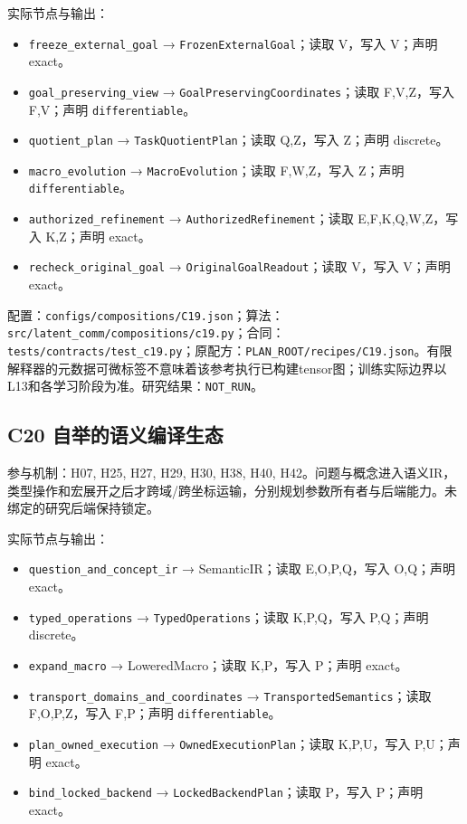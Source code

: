 \documentclass[
  10pt,
]{article}
\begin{document}
实际节点与输出：

\begin{itemize}
\item
  \nolinkurl{freeze_external_goal} →
  \nolinkurl{FrozenExternalGoal}；读取 V，写入 V；声明 exact。
\item
  \nolinkurl{goal_preserving_view} →
  \nolinkurl{GoalPreservingCoordinates}；读取 F,V,Z，写入 F,V；声明
  \nolinkurl{differentiable}。
\item
  \nolinkurl{quotient_plan} → \nolinkurl{TaskQuotientPlan}；读取
  Q,Z，写入 Z；声明 discrete。
\item
  \nolinkurl{macro_evolution} → \nolinkurl{MacroEvolution}；读取
  F,W,Z，写入 Z；声明 \nolinkurl{differentiable}。
\item
  \nolinkurl{authorized_refinement} →
  \nolinkurl{AuthorizedRefinement}；读取 E,F,K,Q,W,Z，写入 K,Z；声明
  exact。
\item
  \nolinkurl{recheck_original_goal} →
  \nolinkurl{OriginalGoalReadout}；读取 V，写入 V；声明 exact。
\end{itemize}

配置：{\small\nolinkurl{configs/compositions/C19.json}}；算法：{\small\nolinkurl{src/latent_comm/compositions/c19.py}}；合同：{\small\nolinkurl{tests/contracts/test_c19.py}}；原配方：{\small\nolinkurl{PLAN_ROOT/recipes/C19.json}}。有限解释器的元数据可微标签不意味着该参考执行已构建tensor图；训练实际边界以L13和各学习阶段为准。研究结果：\nolinkurl{NOT_RUN}。

\subsection{C20
自举的语义编译生态}\label{c20-ux81eaux4e3eux7684ux8bedux4e49ux7f16ux8bd1ux751fux6001}

参与机制：H07, H25, H27, H29, H30, H38, H40,
H42。问题与概念进入语义IR，类型操作和宏展开之后才跨域/跨坐标运输，分别规划参数所有者与后端能力。未绑定的研究后端保持锁定。

实际节点与输出：

\begin{itemize}
\item
  \nolinkurl{question_and_concept_ir} → SemanticIR；读取 E,O,P,Q，写入
  O,Q；声明 exact。
\item
  \nolinkurl{typed_operations} → \nolinkurl{TypedOperations}；读取
  K,P,Q，写入 P,Q；声明 discrete。
\item
  \nolinkurl{expand_macro} → LoweredMacro；读取 K,P，写入 P；声明
  exact。
\item
  \nolinkurl{transport_domains_and_coordinates} →
  \nolinkurl{TransportedSemantics}；读取 F,O,P,Z，写入 F,P；声明
  \nolinkurl{differentiable}。
\item
  \nolinkurl{plan_owned_execution} →
  \nolinkurl{OwnedExecutionPlan}；读取 K,P,U，写入 P,U；声明 exact。
\item
  \nolinkurl{bind_locked_backend} → \nolinkurl{LockedBackendPlan}；读取
  P，写入 P；声明 exact。
\end{itemize}
\end{document}
